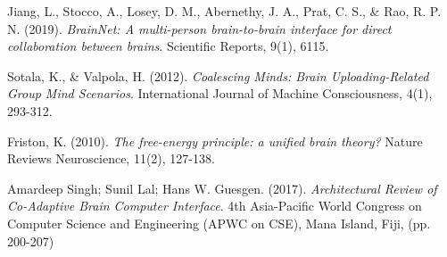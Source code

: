 \documentclass[11pt]{article}
\begin{document}
\begin{thebibliography}{99}
 Jiang, L., Stocco, A., Losey, D. M., Abernethy, J. A., Prat, C. S., \& Rao, R. P. N. (2019). \textit{BrainNet: A multi-person brain-to-brain interface for direct collaboration between brains}. Scientific Reports, 9(1), 6115.

 Sotala, K., \& Valpola, H. (2012). \textit{Coalescing Minds: Brain Uploading-Related Group Mind Scenarios}. International Journal of Machine Consciousness, 4(1), 293-312.

 Friston, K. (2010). \textit{The free-energy principle: a unified brain theory?} Nature Reviews Neuroscience, 11(2), 127-138.

 Amardeep Singh; Sunil Lal; Hans W. Guesgen. (2017). \textit{Architectural Review of Co-Adaptive Brain Computer Interface}. 4th Asia-Pacific World Congress on Computer Science and Engineering (APWC on CSE), Mana Island, Fiji, (pp. 200-207)

\end{thebibliography}
\end{document}
